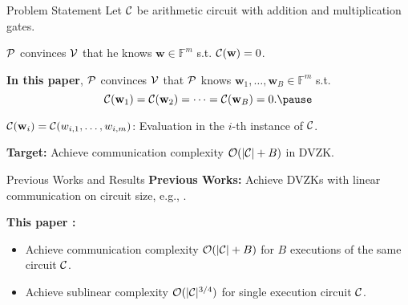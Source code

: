 \begin{frame}{Problem Statement}
	Let $\mathcal{C}$ be arithmetic circuit with addition and multiplication gates.\pause
	
	$\mathcal{P}$ convinces $\mathcal{V}$ that he knows $\mathbf{w} \in \mathbb{F}^m$ s.t. $\mathcal{C}(\mathbf{w}) = 0$.\pause
	
	\textbf{In this paper}, $\mathcal{P}$ convinces $\mathcal{V}$ that $\mathcal{P}$ knows $\mathbf{w}_1, \dots, \mathbf{w}_B \in \mathbb{F}^m$ s.t.\pause
	\begin{equation*}
		\Circuit(\mathbf{w}_1) = \Circuit(\mathbf{w}_2) = \dots = \Circuit(\mathbf{w}_B) = 0.\pause
	\end{equation*}

	$\mathcal{C}(\mathbf{w}_i) = \mathcal{C}(w_{i,1}, \dots, w_{i, m})$: Evaluation in the $i$-th instance of $\mathcal{C}$.\pause
	
	\textbf{Target:} Achieve communication complexity $\mathcal{O}(|\mathcal{C}| + B)$ in DVZK.
\end{frame}
\begin{frame}{Previous Works and Results}
	\textbf{Previous Works:} Achieve DVZKs with linear communication on circuit size, e.g., \cite{YangSWW21, BaumBMRS21, DittmerILO22}.\pause
	
	\textbf{This paper \cite{Weng0YX022}:}\pause
	\begin{itemize}
		\item Achieve communication complexity $\mathcal{O}(|\mathcal{C}| + B)$ for $B$ executions of the same circuit $\mathcal{C}$. \pause
		\item Achieve sublinear complexity $\mathcal{O}(|\mathcal{C}|^{3/4})$ for single execution circuit $\mathcal{C}$. 
	\end{itemize}
\end{frame}